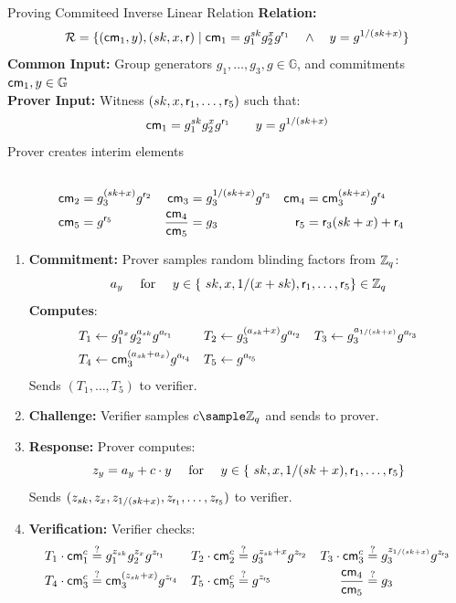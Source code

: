 \begin{protocol}{Proving Commiteed Inverse Linear Relation}{}\label{pok-committed-inverse-relation}
\textbf{Relation: }
\[
\mathcal{R} = \{(\mathsf{cm}_1, y), (sk, x, \mathsf{r}) \mid  \mathsf{cm}_1 = g_1^{sk}g_2^x g^{\mathsf{r}_1} \quad \wedge \quad  y = g^{1/(sk + x)}\}
\]
\textbf{Common Input:} Group generators $g_1, \ldots, g_3, g \in \mathbb{G}$, and commitments $\mathsf{cm}_1, y \in \mathbb{G}$\\
\textbf{Prover Input:} Witness $(sk, x, \mathsf{r}_1, \ldots, \mathsf{r}_5)$ such that:
\[
\mathsf{cm}_1 = g_1^{sk}g_2^{x} g^{\mathsf{r}_1} \qquad y = g^{1/(sk + x)}
\]
Prover creates interim elements
    \begin{align*}
        \\
        \mathsf{cm}_2 &= g_3^{(sk+x)} g^{\mathsf{r}_2}
        &
        \mathsf{cm}_3 &= g_3^{1/(sk+x)} g^{\mathsf{r}_3}
        &
        \mathsf{cm}_4 &= \mathsf{cm}_3^{(sk+x)} g^{\mathsf{r}_4}
        \\
        \mathsf{cm}_5 &= g^{\mathsf{r}_5}
        &
        \frac{\mathsf{cm}_4}{\mathsf{cm}_5} &= g_3
        &
        \mathsf{r}_5 &= \mathsf{r}_3(sk+x) + \mathsf{r}_4
    \end{align*}
\begin{enumerate}
    \item \textbf{Commitment:} Prover samples random blinding factors from $\mathbb{Z}_q$:
       \[
        a_y \quad \text{ for } \quad y \in \{\ sk,x, 1/(x+sk), \mathsf{r}_1, \ldots, \mathsf{r}_5\} \in \mathbb{Z}_q
        \]
    \textbf{Computes}:
    \begin{align*}
        T_1 &\gets g_1^{a_x}g_2^{a_{sk}} g^{a_{\mathsf{r}_1}}  &   T_2 &\gets g_3^{(a_{sk} + x)} g^{a_{\mathsf{r}_2}}     &   T_3 &\gets g_3^{a_{1/(sk + x)}} g^{a_{\mathsf{r}_3}} \\
        T_4 &\gets \mathsf{cm}_3^{(a_{sk} + a_x)} g^{a_{\mathsf{r}_4}} & 
        T_5 &\gets g^{a_{\mathsf{r}_5}}
    \end{align*}
    Sends $(T_1, \ldots, T_5)$ to verifier.
    
    \item \textbf{Challenge:} Verifier samples $c \sample \mathbb{Z}_q$ and sends to prover.
    
    \item \textbf{Response:} Prover computes:
    \[
    z_y = a_y + c \cdot y \quad \text{ for } \quad y \in \{\ sk, x, 1/(sk + x), \mathsf{r}_1, \ldots, \mathsf{r}_5\} 
    \]
    Sends $(z_{sk},z_x, z_{1/(sk + x)}, z_{\mathsf{r}_1}, \ldots,  z_{\mathsf{r}_5})$ to verifier.
    
    \item \textbf{Verification:} Verifier checks:
    \begin{align*}
        T_1 \cdot \mathsf{cm}_1^c &\stackrel{?}{=}  g_1^{z_{sk}}g_2^{z_x} g^{z_{\mathsf{r}_1}}
        & 
        T_2 \cdot \mathsf{cm}_2^c &\stackrel{?}{=}  g_3^{z_{sk} + x} g^{z_{\mathsf{r}_2}}
        &
        T_3 \cdot \mathsf{cm}_3^c &\stackrel{?}{=}  g_3^{z_{1/(sk + x)}}  g^{z_{\mathsf{r}_3}}
         \\
        T_4 \cdot \mathsf{cm}_3^c &\stackrel{?}{=} \mathsf{cm}_3^{(z_{sk} + x)} g^{z_{\mathsf{r}_4}}
        &
        T_5 \cdot \mathsf{cm}_5^c &\stackrel{?}{=}  g^{z_{\mathsf{r}_5}}
        &
        \frac{\mathsf{cm}_4}{\mathsf{cm}_5} &\stackrel{?}{=} g_3
    \end{align*}
\end{enumerate}
\end{protocol}
